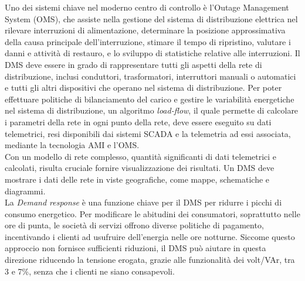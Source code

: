 Uno dei sistemi chiave nel moderno centro di controllo è l'Outage Management System (OMS), che assiste nella gestione del sistema di distribuzione elettrica nel rilevare interruzioni di alimentazione, determinare la posizione approssimativa della causa principale dell'interruzione, stimare il tempo di ripristino, valutare i danni e attività di restauro, e lo sviluppo di statistiche relative alle interruzioni. Il DMS deve essere in grado di rappresentare tutti gli aspetti della rete di distribuzione, inclusi conduttori, trasformatori, interruttori manuali o automatici e tutti gli altri dispositivi che operano nel sistema di distribuzione. Per poter effettuare politiche di bilanciamento del carico e gestire le variabilità energetiche nel sistema di distribuzione, un algoritmo \emph{load-flow}, il quale permette di calcolare i parametri della rete in ogni punto della rete, deve essere eseguito su dati telemetrici, resi disponibili dai sistemi SCADA e la telemetria ad essi associata, mediante la tecnologia AMI e l'OMS. 
\\
Con un modello di rete complesso, quantità significanti di dati telemetrici e calcolati, risulta cruciale fornire visualizzazione dei risultati. Un DMS deve mostrare i dati delle rete in viste geografiche, come mappe, schematiche e diagrammi. 
\\
La \emph{Demand response} è una funzione chiave per il DMS per ridurre i picchi di consumo energetico. Per modificare le abitudini dei consumatori, soprattutto nelle ore di punta, le società di servizi offrono diverse politiche di pagamento, incentivando i clienti ad usufruire dell'energia nelle ore notturne. Siccome questo approccio non fornisce sufficienti riduzioni, il DMS può aiutare in questa direzione riducendo la tensione erogata, grazie alle funzionalità dei volt/VAr, tra 3 e 7\%, senza che i clienti ne siano consapevoli.










